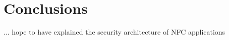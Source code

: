 \label{chap:conclusions}
\section{Conclusions}

... hope to have explained the security architecture of NFC applications

